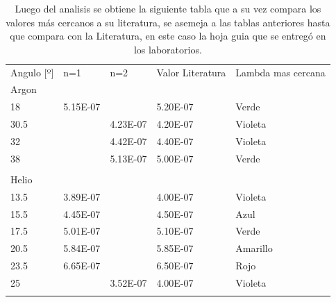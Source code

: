 \documentclass[a4paper,twocolumn,10pt]{article}
\begin{document}
\newpage

\begin{table}
\centering
\caption{Luego del analisis se obtiene la siguiente tabla que a su vez compara los valores más cercanos a su literatura, se asemeja a las tablas anteriores hasta que compara con la Literatura, en este caso la hoja guia que se entregó en los laboratorios.}
\begin{tabular}{lllll}
\rowcolor[rgb]{0,0.82,0.941} Angulo [º] & n=1      & n=2      & Valor Literatura & Lambda mas cercana  \\
\rowcolor{cyan} Argon                   &          &          &                  &                     \\
18                                      & 5.15E-07 &          & 5.20E-07         & Verde               \\
30.5                                    &          & 4.23E-07 & 4.20E-07         & Violeta             \\
32                                      &          & 4.42E-07 & 4.40E-07         & Violeta             \\
38                                      &          & 5.13E-07 & 5.00E-07         & Verde               \\
                                        &          &          &                  &                     \\
\rowcolor{cyan} Helio                   &          &          &                  &                     \\
13.5                                    & 3.89E-07 &          & 4.00E-07         & Violeta             \\
15.5                                    & 4.45E-07 &          & 4.50E-07         & Azul                \\
17.5                                    & 5.01E-07 &          & 5.10E-07         & Verde               \\
20.5                                    & 5.84E-07 &          & 5.85E-07         & Amarillo            \\
23.5                                    & 6.65E-07 &          & 6.50E-07         & Rojo                \\
25                                      &          & 3.52E-07 & 4.00E-07         & Violeta             \\
                                        &          &          &                  &                     \\

\end{tabular}
\end{table}
\end{document}
